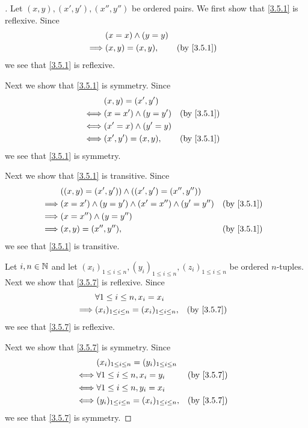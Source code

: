\begin{proof}[]
	Let \((x, y), (x', y'), (x'', y'')\) be ordered pairs.
	We first show that \cref{3.5.1} is reflexive.
	Since
	\begin{align*}
		         & (x = x) \land (y = y)                 \\
		\implies & (x, y) = (x, y),      &  & \by{3.5.1}
	\end{align*}
	we see that \cref{3.5.1} is reflexive.

	Next we show that \cref{3.5.1} is symmetry.
	Since
	\begin{align*}
		     & (x, y) = (x', y')                       \\
		\iff & (x = x') \land (y = y') &  & \by{3.5.1} \\
		\iff & (x' = x) \land (y' = y)                 \\
		\iff & (x', y') = (x, y),      &  & \by{3.5.1}
	\end{align*}
	we see that \cref{3.5.1} is symmetry.

	Next we show that \cref{3.5.1} is transitive.
	Since
	\begin{align*}
		         & ((x, y) = (x', y')) \land ((x', y') = (x'', y''))                         \\
		\implies & (x = x') \land (y = y') \land (x' = x'') \land (y' = y'') &  & \by{3.5.1} \\
		\implies & (x = x'') \land (y = y'')                                                 \\
		\implies & (x, y) = (x'', y''),                                      &  & \by{3.5.1}
	\end{align*}
	we see that \cref{3.5.1} is transitive.

	Let \(i, n \in \mathbb{N}\) and let \((x_i)_{1 \leq i \leq n}, (y_i)_{1 \leq i \leq n}, (z_i)_{1 \leq i \leq n}\) be ordered \(n\)-tuples.
	Next we show that \cref{3.5.7} is reflexive.
	Since
	\begin{align*}
		         & \forall 1 \leq i \leq n, x_i = x_i                                 \\
		\implies & (x_i)_{1 \leq i \leq n} = (x_i)_{1 \leq i \leq n}, &  & \by{3.5.7}
	\end{align*}
	we see that \cref{3.5.7} is reflexive.

	Next we show that \cref{3.5.7} is symmetry.
	Since
	\begin{align*}
		     & (x_i)_{1 \leq i \leq n} = (y_i)_{1 \leq i \leq n}                  \\
		\iff & \forall 1 \leq i \leq n, x_i = y_i                 &  & \by{3.5.7} \\
		\iff & \forall 1 \leq i \leq n, y_i = x_i                                 \\
		\iff & (y_i)_{1 \leq i \leq n} = (x_i)_{1 \leq i \leq n}, &  & \by{3.5.7}
	\end{align*}
	we see that \cref{3.5.7} is symmetry.


\end{proof}
